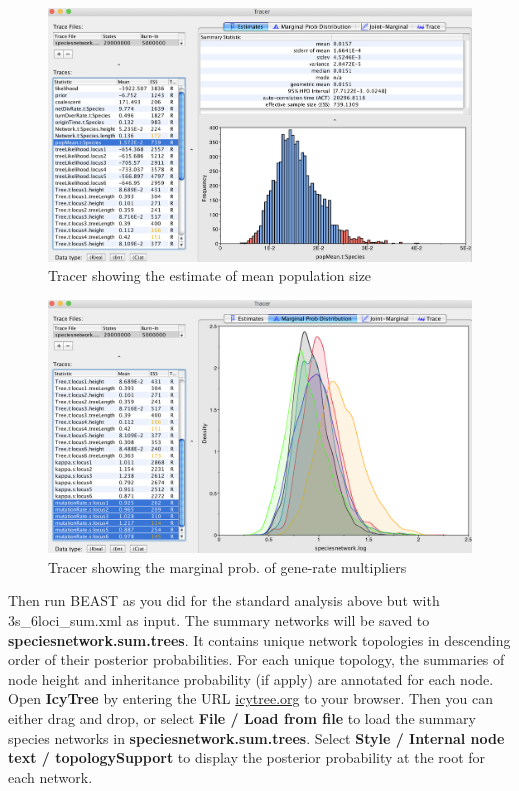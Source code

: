\documentclass[11pt]{article}
\begin{document}
\begin{figure}[h]
\center
\includegraphics[width=1.0\textwidth]{figs/fig10_tracer1}
\caption{Tracer showing the estimate of mean population size}
\label{fig_tracer1}
\end{figure}

\begin{figure}[h]
\center
\includegraphics[width=1.0\textwidth]{figs/fig11_tracer2}
\caption{Tracer showing the marginal prob. of gene-rate multipliers}
\label{fig_tracer2}
\end{figure}
\clearpage

\noindent Then run BEAST as you did for the standard analysis above but with 3s\_6loci\_sum.xml as input. The summary networks will be saved to \textbf{speciesnetwork.sum.trees}. It contains unique network topologies in descending order of their posterior probabilities. For each unique topology, the summaries of node height and inheritance probability (if apply) are annotated for each node. 
Open \textbf{IcyTree} by entering the URL \url{icytree.org} to your browser. Then you can either drag and drop, or select \textbf{File / Load from file} to load the summary species networks in \textbf{speciesnetwork.sum.trees}. Select \textbf{Style / Internal node text / topologySupport} to display the posterior probability at the root for each network.
\end{document}
